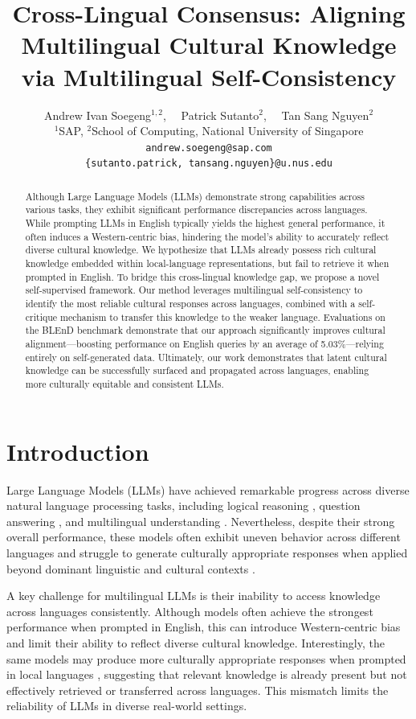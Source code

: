 \documentclass[11pt]{article}
\title{Cross-Lingual Consensus: Aligning Multilingual Cultural Knowledge via Multilingual Self-Consistency}
\author{Andrew Ivan Soegeng$^{1,2}$, \ \ Patrick Sutanto$^{2}$, \ \ Tan Sang Nguyen$^{2}$ \\
$^{1}$SAP, \quad $^{2}$School of Computing, National University of Singapore \\
\texttt{andrew.soegeng@sap.com} \\
\texttt{\{sutanto.patrick, tansang.nguyen\}@u.nus.edu}
}
\begin{document}
\maketitle
\begin{abstract}
Although Large Language Models (LLMs) demonstrate strong capabilities across various tasks, they exhibit significant performance discrepancies across languages. While prompting LLMs in English typically yields the highest general performance, it often induces a Western-centric bias, hindering the model's ability to accurately reflect diverse cultural knowledge. We hypothesize that LLMs already possess rich cultural knowledge embedded within local-language representations, but fail to retrieve it when prompted in English. To bridge this cross-lingual knowledge gap, we propose a novel self-supervised framework. Our method leverages multilingual self-consistency to identify the most reliable cultural responses across languages, combined with a self-critique mechanism to transfer this knowledge to the weaker language. Evaluations on the BLEnD benchmark demonstrate that our approach significantly improves cultural alignment—boosting performance on English queries by an average of 5.03\%—relying entirely on self-generated data. Ultimately, our work demonstrates that latent cultural knowledge can be successfully surfaced and propagated across languages, enabling more culturally equitable and consistent LLMs.

\end{abstract}



\section{Introduction}
Large Language Models (LLMs) have achieved remarkable progress across diverse natural language processing tasks, including logical reasoning \cite{mondorf2024accuracyevaluatingreasoningbehavior}, question answering \cite{NEURIPS2020_1457c0d6}, and multilingual understanding \cite{workshop2023bloom176bparameteropenaccessmultilingual}. Nevertheless, despite their strong overall performance, these models often exhibit uneven behavior across different languages \cite{DBLP:conf/emnlp/HuangTZZSXW23} and struggle to generate culturally appropriate responses when applied beyond dominant linguistic and cultural contexts \cite{naous-etal-2024-beer}.

A key challenge for multilingual LLMs is their inability to access knowledge across languages consistently. Although models often achieve the strongest performance when prompted in English, this can introduce Western-centric bias and limit their ability to reflect diverse cultural knowledge. Interestingly, the same models may produce more culturally appropriate responses when prompted in local languages \cite{ying-etal-2025-disentangling, myung2024blend}, suggesting that relevant knowledge is already present but not effectively retrieved or transferred across languages. This mismatch limits the reliability of LLMs in diverse real-world settings.
\end{document}
